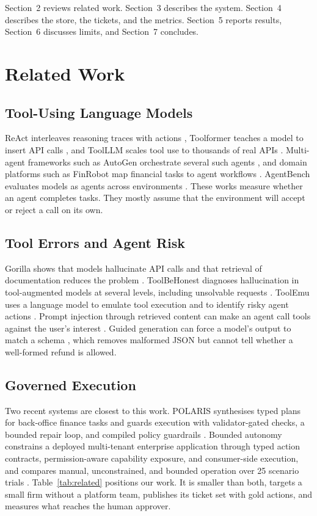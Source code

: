 \documentclass{icaiit2027}
\begin{document}
Section~2 reviews related work. Section~3 describes the system. Section~4 describes the store, the tickets, and the metrics. Section~5 reports results, Section~6 discusses limits, and Section~7 concludes.

\section{Related Work}

\subsection{Tool-Using Language Models}

ReAct interleaves reasoning traces with actions \cite{yao2023}, Toolformer teaches a model to insert API calls \cite{schick2023}, and ToolLLM scales tool use to thousands of real APIs \cite{qin2024}. Multi-agent frameworks such as AutoGen orchestrate several such agents \cite{wu2023}, and domain platforms such as FinRobot map financial tasks to agent workflows \cite{yang2024}. AgentBench evaluates models as agents across environments \cite{liu2024}. These works measure whether an agent completes tasks. They mostly assume that the environment will accept or reject a call on its own.

\subsection{Tool Errors and Agent Risk}

Gorilla shows that models hallucinate API calls and that retrieval of documentation reduces the problem \cite{patil2023}. ToolBeHonest diagnoses hallucination in tool-augmented models at several levels, including unsolvable requests \cite{zhang2024}. ToolEmu uses a language model to emulate tool execution and to identify risky agent actions \cite{ruan2024}. Prompt injection through retrieved content can make an agent call tools against the user's interest \cite{greshake2023,debenedetti2024}. Guided generation can force a model's output to match a schema \cite{willard2023}, which removes malformed JSON but cannot tell whether a well-formed refund is allowed.

\subsection{Governed Execution}

Two recent systems are closest to this work. POLARIS synthesises typed plans for back-office finance tasks and guards execution with validator-gated checks, a bounded repair loop, and compiled policy guardrails \cite{moslemi2026}. Bounded autonomy constrains a deployed multi-tenant enterprise application through typed action contracts, permission-aware capability exposure, and consumer-side execution, and compares manual, unconstrained, and bounded operation over 25 scenario trials \cite{sohail2026}. Table~\ref{tab:related} positions our work. It is smaller than both, targets a small firm without a platform team, publishes its ticket set with gold actions, and measures what reaches the human approver.
\end{document}
